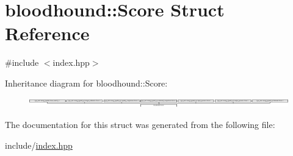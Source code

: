 \hypertarget{structbloodhound_1_1Score}{}\section{bloodhound\+:\+:Score Struct Reference}
\label{structbloodhound_1_1Score}


{\ttfamily \#include $<$index.\+hpp$>$}

Inheritance diagram for bloodhound\+:\+:Score\+:\begin{figure}[H]
\begin{center}
\leavevmode
\includegraphics[height=0.427808cm]{structbloodhound_1_1Score}
\end{center}
\end{figure}


The documentation for this struct was generated from the following file\+:\begin{DoxyCompactItemize}
\item 
include/\mbox{\hyperlink{index_8hpp}{index.\+hpp}}\end{DoxyCompactItemize}
